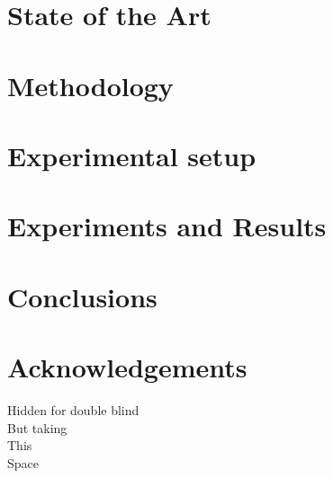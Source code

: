 \documentclass[runningheads,a4paper]{llncs}
\begin{document}

\section{State of the Art}
\label{sec:sota}


\section{Methodology} %
\label{sec:met}


\section{Experimental setup}
\label{sec:exp}



\section{Experiments and Results}
\label{sec:res}





\section{Conclusions}

\section*{Acknowledgements}

Hidden for double blind\\
But taking\\
This\\
Space




\end{document}
